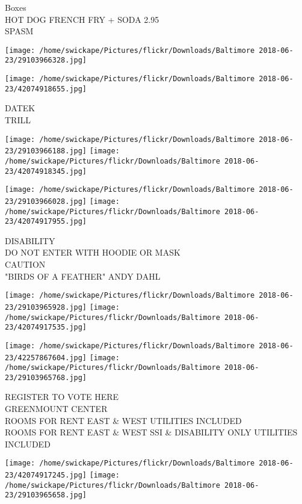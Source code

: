 \documentclass[10pt,letterpaper]{article}
\begin{document}
Boxes\\
HOT DOG FRENCH FRY + SODA 2.95\\
SPASM\\
\pagebreak

\texttt{[image: /home/swickape/Pictures/flickr/Downloads/Baltimore 2018-06-23/29103966328.jpg]}

\vspace{0.25in}
\texttt{[image: /home/swickape/Pictures/flickr/Downloads/Baltimore 2018-06-23/42074918655.jpg]}

DATEK\\
TRILL\\
\pagebreak

\texttt{[image: /home/swickape/Pictures/flickr/Downloads/Baltimore 2018-06-23/29103966188.jpg]}
\texttt{[image: /home/swickape/Pictures/flickr/Downloads/Baltimore 2018-06-23/42074918345.jpg]}

\texttt{[image: /home/swickape/Pictures/flickr/Downloads/Baltimore 2018-06-23/29103966028.jpg]}
\texttt{[image: /home/swickape/Pictures/flickr/Downloads/Baltimore 2018-06-23/42074917955.jpg]}

DISABILITY\\
DO NOT ENTER WITH HOODIE OR MASK\\
CAUTION\\
"BIRDS OF A FEATHER" ANDY DAHL\\
\pagebreak

\texttt{[image: /home/swickape/Pictures/flickr/Downloads/Baltimore 2018-06-23/29103965928.jpg]}
\texttt{[image: /home/swickape/Pictures/flickr/Downloads/Baltimore 2018-06-23/42074917535.jpg]}

\texttt{[image: /home/swickape/Pictures/flickr/Downloads/Baltimore 2018-06-23/42257867604.jpg]}
\texttt{[image: /home/swickape/Pictures/flickr/Downloads/Baltimore 2018-06-23/29103965768.jpg]}

REGISTER TO VOTE HERE\\
GREENMOUNT CENTER\\
ROOMS FOR RENT EAST \& WEST UTILITIES INCLUDED\\
ROOMS FOR RENT EAST \& WEST SSI \& DISABILITY ONLY UTILITIES INCLUDED\\
\pagebreak

\texttt{[image: /home/swickape/Pictures/flickr/Downloads/Baltimore 2018-06-23/42074917245.jpg]}
\texttt{[image: /home/swickape/Pictures/flickr/Downloads/Baltimore 2018-06-23/29103965658.jpg]}
\end{document}
